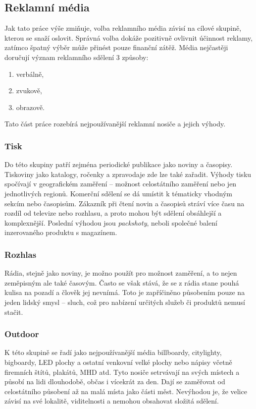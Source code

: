    \subsection{Reklamní média}
    Jak tato práce výše zmiňuje, volba reklamního média závisí na cílové skupině, kterou se snaží oslovit.
    Správná volba dokáže pozitivně ovlivnit účinnost reklamy, zatímco špatný výběr může přinést pouze finanční zátěž.
    Média nejčastěji doručují význam reklamního sdělení 3 způsoby:
    \begin{enumerate}
        \item verbálně,
        \item zvukově,
        \item obrazově.
    \end{enumerate}
    Tato část práce rozebírá nejpoužívanější reklamní nosiče a jejich výhody. \cite{typy:medii} \cite{typy:mediatypy}
    
    \subsubsection{Tisk}
    Do této skupiny patří zejména periodické publikace jako noviny a časopisy. Tiskoviny jako katalogy, ročenky a zpravodaje zde lze také zařadit.
    Výhody tisku spočívají v geografickém zaměření -- možnost celostátního zaměření nebo jen jednotlivých regionů. Komerční sdělení se dá umístit k tématicky
    vhodným sekcím nebo časopisům. Zákazník při čtení novin a časopisů stráví více času na rozdíl od televize nebo rozhlasu,
    a proto mohou být sdělení obsáhlejší a komplexnější. Poslední výhodou jsou \emph{packshoty}, neboli společné balení inzerovaného produktu s magazínem.
    
    \subsubsection{Rozhlas}
    Rádia, stejně jako noviny, je možno použít pro možnost zaměření, a to nejen zeměpisným ale také časovým. Často se však stává,
    že se z rádia stane pouhá kulisa na pozadí a člověk jej nevnímá. Toto je zapříčiněno působením pouze na jeden lidský smysl -- sluch,
    což pro nabízení určitých služeb či produktů nemusí stačit.

    \subsubsection{Outdoor}
    K této skupině se řadí jako nejpoužívanější média billboardy, citylighty, bigboardy, LED plochy a ostatní venkovní velké plochy nebo nápisy včetně
    firemních štítů, plakátů, MHD atd. Tyto nosiče setrvávají na svých místech a působí na lidi dlouhodobě, občas i vícekrát za den.
    Dají se zaměřovat od celostátního působení až na malá místa jako části měst. Nevýhodou je, že velice závisí na své lokalitě, viditelnosti a
    nemohou obsahovat složitá sdělení. 

